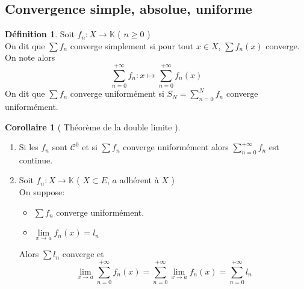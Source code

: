 \documentclass[10pt,a4paper]{article}
\theoremstyle{definition}
\newtheorem{corollaire}[proposition]{Corollaire}
\newtheorem{definition}[proposition]{Définition}
\begin{document}
\subsection{Convergence simple, absolue, uniforme}
\begin{definition}
    Soit $f_n: X \to \mathbb{K}$ ( $n \geq 0$ ) \\
    On dit que $\sum f_n$ converge simplement si pour tout $x \in X$, $\sum f_n(x)$ converge. \\
    On note alors
    \[\sum_{n = 0}^{+\infty}f_n: x \mapsto \sum_{n = 0}^{+\infty} f_n(x)\]
    On dit que $\sum f_n$ converge uniformément si $S_N = \sum\limits_{n = 0}^N f_n$ converge uniformément.
\end{definition}
\begin{corollaire}[ Théorème de la double limite ]
    \hfill
    \begin{enumerate}
        \item Si les $f_n$ sont $\mathcal{C}^0$ et si $\sum f_n$ converge uniformément alors $\sum\limits_{n = 0}^{+\infty} f_n$ est continue.
        \item Soit $f_n: X \to \mathbb{K}$ ( $X \subset E$, $a$ adhérent à $X$ ) \\
        On suppose:
        \begin{itemize}
            \item $\sum f_n$ converge uniformément.
            \item $\lim\limits_{x \to a} f_n(x) = l_n$
        \end{itemize}
        Alors $\sum l_n$ converge et
        \[ \boxed{\lim_{x \to a} \sum_{n = 0}^{+\infty} f_n(x) = \sum_{n = 0}^{+\infty} \lim_{x \to a} f_n(x) = \sum_{n = 0}^{+\infty} l_n}\]
    \end{enumerate}
\end{corollaire}
\end{document}
